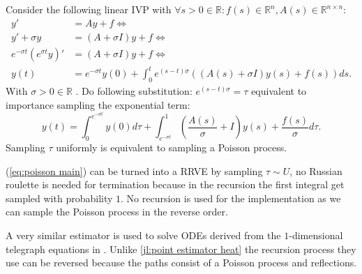\documentclass[a4paper,12pt]{article}
\begin{document}
\begin{definition} \label{def:main poisson}
  Consider the following linear IVP with $\forall s>0 \in \mathbb{R}: f(s) \in \mathbb{R}^{n}, A(s) \in \mathbb{R}^{n \times n}$:
  \begin{align}
    y'                              & = A y + f \Leftrightarrow                                                                             \\
    y'+\sigma y                     & = (A + \sigma I) y + f\Leftrightarrow                                                                 \\
    e^{-\sigma t} ( e^{\sigma t}y)' & = (A + \sigma I) y + f  \Leftrightarrow                                                               \\
    y(t)                            & = e^{-\sigma t} y(0) + \int_{0}^{t} e^{(s-t) \sigma} \left(  (A(s) + \sigma I ) y(s) +f(s)\right) ds.
  \end{align}
  With $\sigma>0 \in \mathbb{R}$ . Do following substitution: $e^{(s-t)\sigma} = \tau$ equivalent to importance sampling
  the exponential term:
  \begin{equation} \label{eq:poisson main}
    y(t) = \int_{0}^{e^{-\sigma t}}  y(0) d\tau + \int_{e^{-\sigma t}}^{1} \left(  \frac{A(s)}{\sigma} + I\right)  y(s) + \frac{f(s)}{\sigma} d\tau
    .
  \end{equation}
  Sampling $\tau$ uniformly is equivalent to sampling a Poisson process.
\end{definition}

\begin{julia} \label{jl:main poisson}
  (\ref{eq:poisson main}) can be turned into a RRVE by sampling $\tau \sim U$, no Russian roulette is needed for
  termination because in the recursion the first integral get sampled with probability $1$. No recursion is used
  for the implementation as we can sample the Poisson process in the reverse order.

\end{julia}

\begin{related}
  A very similar estimator is used to solve ODEs derived from the
  $1$-dimensional telegraph equations in \cite{acebron_monte_2016}.
  Unlike \ref{jl:point estimator heat} the recursion process they use can be reversed
  because the paths consist of a Poisson process and reflections.
\end{related}
\end{document}
